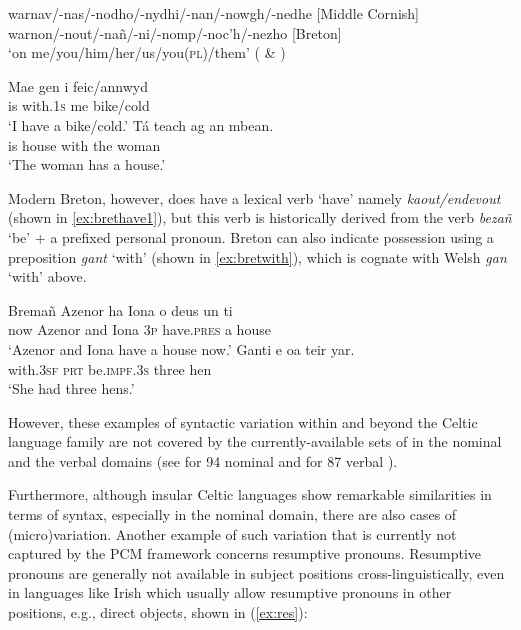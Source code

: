 \documentclass[output=paper,colorlinks,citecolor=brown]{langscibook}
\begin{document}
\ea
warnav/-nas/-nodho/-nydhi/-nan/-nowgh/-nedhe \hspace{0.7cm} [Middle Cornish] \\
warnon/-nout/-nañ/-ni/-nomp/-noc'h/-nezho \hspace{1.5cm}[Breton] \\
\glt `on me/you/him/her/us/you(\textsc{pl})/them' (\citealt{mm:toorians_towards_2014} \& \cite[30]{mm:wmffre_central_1998})
\label{ex:infprep}
\z

\ea
\ea
\settowidth\jamwidth{[Welsh]}
\gll Mae gen i feic/annwyd\\
is with.\textsc{1s} me bike/cold\\ \jambox{[Welsh]}
\glt `I have a bike/cold.'
\ex
\gll Tá teach ag an mbean.\\
is house with the woman\\ \jambox{[Irish]}
\glt `The woman has a house.'
\z
\label{ex:have}
\z

\noindent Modern Breton, however, does have a lexical verb `have' namely \textit{kaout/endevout} (shown in \ref{ex:brethave1}), but this verb is historically derived from the verb \textit{bezañ} `be' + a prefixed personal pronoun. Breton can also indicate possession using a preposition \textit{gant} `with' (shown in \ref{ex:bretwith}), which is cognate with Welsh \textit{gan} `with' above.

\ea 
\ea 
\settowidth\jamwidth{[Breton]}
\gll Bremañ Azenor ha Iona o deus un ti\\
now Azenor and Iona 3\textsc{p} have.\textsc{pres} a house\\ \jambox{[Breton]}
\glt `Azenor and Iona have a house now.' 
\label{ex:brethave1}
\ex
\gll Ganti e oa teir yar.\\
with.\textsc{3sf} \textsc{prt} be.\textsc{impf}.\textsc{3s} three hen\\  \jambox{[Breton]}
\glt `She had three hens.' 
\label{ex:bretwith}
\z
\z

\noindent However, these examples of syntactic variation within and beyond the Celtic language family are not covered by the currently-available sets of  in the nominal and the verbal domains (see \citealt{mm:crisma_syntactic_2020} for 94 nominal  and \citealt{mm:bakerroberts2024} for 87 verbal ).

Furthermore, although insular Celtic languages show remarkable similarities in terms of syntax, especially in the nominal domain, there are also cases of (micro)variation. Another example of such variation that is currently not captured by the PCM framework concerns resumptive pronouns. Resumptive pronouns are generally not available in subject positions cross-linguistically, even in languages like Irish which usually allow resumptive pronouns in other positions, e.g., direct objects, shown in (\ref{ex:res}):
\end{document}
